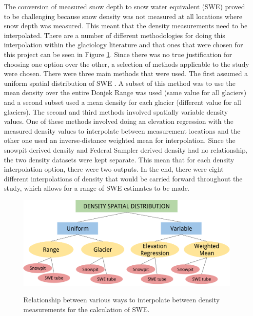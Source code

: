 \documentclass[12pt]{article}
\begin{document}
The conversion of measured snow depth to snow water equivalent (SWE) proved to be challenging because snow density was not measured at all locations where snow depth was measured. This meant that the density measurements need to be interpolated. There are a number of different methodologies for doing this interpolation within the glaciology literature and that ones that were chosen for this project can be seen in Figure \ref{fig:SWEoptions}. Since there was no true justification for choosing one option over the other, a selection of methods applicable to the study were chosen. There were three main methods that were used. The first assumed a uniform spatial distribution of SWE \citep[e.g.]{McGrath2015, Elder1991}. A subset of this method was to use the mean density over the entire Donjek Range was used (same value for all glaciers) and a second subset used a mean density for each glacier (different value for all glaciers). The second and third methods involved spatially variable density values. One of these methods involved doing an elevation regression with the measured density values to interpolate between measurement locations and the other one used an inverse-distance weighted mean for interpolation. Since the snowpit derived density and Federal Sampler derived density had no relationship, the two density datasets were kept separate. This mean that for each density interpolation option, there were two outputs. In the end, there were eight different interpolations of density that would be carried forward throughout the study, which allows for a range of SWE estimates to be made.

{
\begin{figure} 
	\centering
	\includegraphics[width = \textwidth]{SWEoptions.png}\\
	\caption{Relationship between various ways to interpolate between density measurements for the calculation of SWE.}
	\label{fig:SWEoptions}
\end{figure}
}
\end{document}
